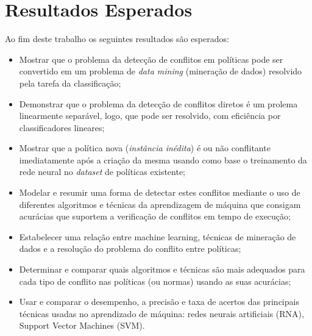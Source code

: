 \documentclass[
	12pt,				%
	openright,			%
	oneside,			%
	a4paper,			%
	english,			%
	french,				%
	spanish,			%
	brazil				%
	]{abntex2}
\begin{document}
\section{Resultados Esperados}\label{resultados_esperados}
Ao fim deste trabalho os seguintes resultados são esperados:
\begin{itemize}
	\item Mostrar que o problema da detecção de conflitos em políticas pode ser convertido em um problema de \textit{data mining} (mineração de dados) resolvido pela tarefa da classificação;
	\item Demonstrar que o problema da detecção de conflitos diretos é um prolema linearmente separável, logo, que pode ser resolvido, com eficiência por classificadores lineares;
	\item Mostrar que a política nova (\textit{instância inédita})  é ou não conflitante imediatamente após a criação da mesma usando como base o treinamento da rede neural no \textit{dataset} de políticas existente;
	\item Modelar e resumir uma forma de detectar estes conflitos mediante o uso de diferentes algoritmos e técnicas da aprendizagem de máquina que consigam acurácias que suportem a verificação de conflitos em tempo de execução;
	\item Estabelecer uma relação entre machine learning, técnicas de mineração de dados e a resolução do problema do conflito entre políticas;
	\item Determinar e comparar quais algoritmos e técnicas são mais adequados para cada tipo de conflito nas políticas (ou normas) usando as suas acurácias;
	\item Usar e comparar o desempenho, a precisão e taxa de acertos das principais técnicas usadas no aprendizado de máquina: redes neurais artificiais (RNA), Support Vector Machines (SVM).

\end{itemize} 
\end{document}
